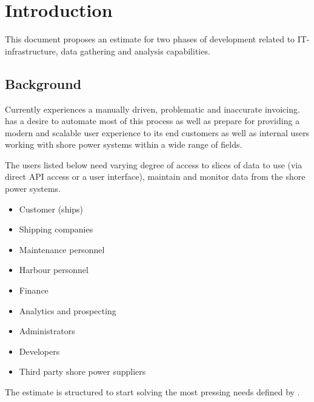 \section{Introduction}
This document proposes an estimate for two phases of development related to \customername IT-infrastructure, data gathering and analysis capabilities.


\subsection{Background}
Currently \customername experiences a manually driven, problematic and inaccurate invoicing. \customername has a desire to automate most of this process as well as prepare for providing a modern and scalable user experience to its end customers as well as internal users working with \customername shore power systems within a wide range of fields.

The users listed below need varying degree of access to slices of data to use (via direct API access or a user interface), maintain and monitor data from the shore power systems. 

\begin{itemize}
\item Customer (ships)
\item Shipping companies
\item Maintenance personnel
\item Harbour personnel
\item Finance
\item Analytics and prospecting
\item Administrators
\item Developers
\item Third party shore power suppliers
\end{itemize}

The estimate is structured to start solving the most pressing needs defined by \customername. 


